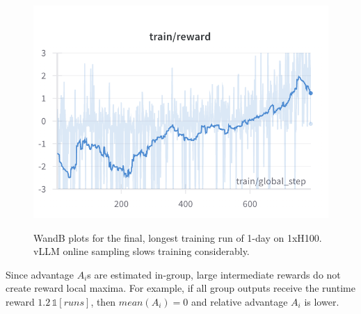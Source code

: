 \documentclass{article}
\begin{document}
\begin{figure}[t]
{    \includegraphics[width=0.95\columnwidth]{bin/reward.png}
    \label{fig:reward}
  }
  \hspace{0.05\columnwidth}
  \caption{WandB plots for the final, longest training run of 1-day on 1xH100. vLLM online sampling slows training considerably.}
  \label{fig:grid2x2}
\end{figure}

Since advantage $A_i$s are estimated in-group, large intermediate rewards do not create reward local maxima. For example, if all group outputs receive the runtime reward $1.2\, \mathds{1} [runs]$, then $mean(A_i) = 0$ and relative advantage $A_i$ is lower.
\end{document}
